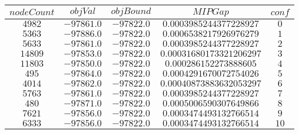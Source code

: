 \begin{center}
\begin{tabular}{|c|c|c|c|c|}
\hline
$nodeCount$ & $objVal$ & $objBound$ & $MIPGap$ & $conf$\\\hline
$4982$ & $-97861.0$ & $-97822.0$ & $0.0003985244377228927$ & $0$ \\\hline
$5363$ & $-97886.0$ & $-97822.0$ & $0.0006538217926976279$ & $1$ \\\hline
$5633$ & $-97861.0$ & $-97822.0$ & $0.0003985244377228927$ & $2$ \\\hline
$14809$ & $-97853.0$ & $-97822.0$ & $0.00031680173321206297$ & $3$ \\\hline
$11803$ & $-97850.0$ & $-97822.0$ & $0.000286152273888605$ & $4$ \\\hline
$495$ & $-97864.0$ & $-97822.0$ & $0.0004291670072754026$ & $5$ \\\hline
$4014$ & $-97862.0$ & $-97822.0$ & $0.00040873883632053297$ & $6$ \\\hline
$5763$ & $-97861.0$ & $-97822.0$ & $0.0003985244377228927$ & $7$ \\\hline
$480$ & $-97871.0$ & $-97822.0$ & $0.0005006590307649866$ & $8$ \\\hline
$7621$ & $-97856.0$ & $-97822.0$ & $0.0003474493132766514$ & $9$ \\\hline
$6333$ & $-97856.0$ & $-97822.0$ & $0.0003474493132766514$ & $10$ \\\hline
\end{tabular}
\end{center}